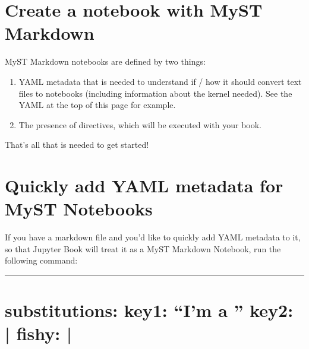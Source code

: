 \documentclass[letterpaper,10pt,english]{jupyterBook}
\begin{document}
\section{Create a notebook with MyST Markdown}
\label{\detokenize{src/test/markdown-notebooks:create-a-notebook-with-myst-markdown}}
\sphinxAtStartPar
MyST Markdown notebooks are defined by two things:
\begin{enumerate}
%
\item {} 
\sphinxAtStartPar
YAML metadata that is needed to understand if / how it should convert text files to notebooks (including information about the kernel needed).
See the YAML at the top of this page for example.

\item {} 
\sphinxAtStartPar
The presence of  directives, which will be executed with your book.

\end{enumerate}

\sphinxAtStartPar
That’s all that is needed to get started!


\section{Quickly add YAML metadata for MyST Notebooks}
\label{\detokenize{src/test/markdown-notebooks:quickly-add-yaml-metadata-for-myst-notebooks}}
\sphinxAtStartPar
If you have a markdown file and you’d like to quickly add YAML metadata to it, so that Jupyter Book will treat it as a MyST Markdown Notebook, run the following command:

\begin{sphinxVerbatim}[commandchars=\\\{\}]
   
\end{sphinxVerbatim}


\bigskip\hrule\bigskip



\section{substitutions:
key1: “I’m a ”
key2: |
fishy: |
}
\label{\detokenize{src/test/markdown-notebooks:substitutions-key1-im-a-substitution-key2-note-key1-fishy-image-img-fun-fish-png-alt-fishy-width-200px}}
\sphinxstepscope
\end{document}
